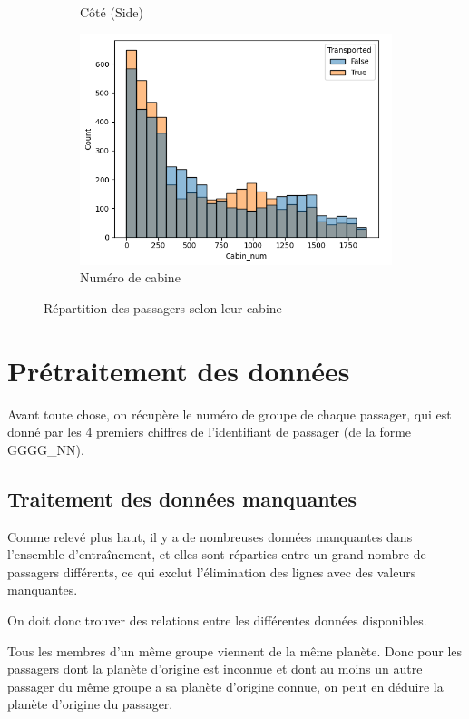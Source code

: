 \documentclass[a4paper]{article}
\begin{document}
\begin{figure}
\begin{subfigure}{.5\textwidth}
            \caption{Côté (Side)}
        \end{subfigure}
        \begin{subfigure}{.5\textwidth}
            \centering
            \includegraphics[width=\linewidth]{images/Figure 7-3.png}
            \caption{Numéro de cabine}
        \end{subfigure}
        \caption{Répartition des passagers selon leur cabine}
    \end{figure}

    \section{Prétraitement des données}

    Avant toute chose, on récupère le numéro de groupe de chaque passager, qui est donné par les 4 premiers chiffres
    de l'identifiant de passager (de la forme GGGG\_NN).

    \subsection{Traitement des données manquantes}

    Comme relevé plus haut, il y a de nombreuses données manquantes dans l'ensemble d'entraînement,
    et elles sont réparties entre un grand nombre de passagers différents, ce qui exclut l'élimination
    des lignes avec des valeurs manquantes.

    On doit donc trouver des relations entre les différentes données disponibles.

    Tous les membres d'un même groupe viennent de la même planète. Donc pour les passagers dont la planète d'origine
    est inconnue et dont au moins un autre passager du même groupe a sa planète d'origine connue,
    on peut en déduire la planète d'origine du passager.
\end{document}
